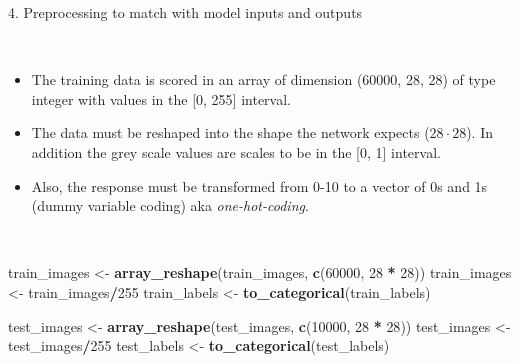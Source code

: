 \documentclass[10pt,ignorenonframetext,]{beamer}
\newenvironment{Shaded}{\begin{snugshade}}{\end{snugshade}}
\newcommand{\DecValTok}[1]{\textcolor[rgb]{0.00,0.00,0.81}{#1}}
\newcommand{\KeywordTok}[1]{\textcolor[rgb]{0.13,0.29,0.53}{\textbf{#1}}}
\newcommand{\NormalTok}[1]{#1}
\newcommand{\OperatorTok}[1]{\textcolor[rgb]{0.81,0.36,0.00}{\textbf{#1}}}
\newcommand{\StringTok}[1]{\textcolor[rgb]{0.31,0.60,0.02}{#1}}
\begin{document}
\begin{frame}[fragile]

\begin{block}{4. Preprocessing to match with model inputs and outputs}

\(~\)

\begin{itemize}
\item
  The training data is scored in an array of dimension (60000, 28, 28)
  of type integer with values in the {[}0, 255{]} interval.
\item
  The data must be reshaped into the shape the network expects
  (\(28\cdot 28\)). In addition the grey scale values are scales to be
  in the {[}0, 1{]} interval.
\item
  Also, the response must be transformed from 0-10 to a vector of 0s and
  1s (dummy variable coding) aka \emph{one-hot-coding}.
\end{itemize}

\(~\)

\scriptsize

\begin{Shaded}
\begin{Highlighting}[]
\NormalTok{train_images <-}\StringTok{ }\KeywordTok{array_reshape}\NormalTok{(train_images, }\KeywordTok{c}\NormalTok{(}\DecValTok{60000}\NormalTok{, }\DecValTok{28} \OperatorTok{*}\StringTok{ }\DecValTok{28}\NormalTok{))}
\NormalTok{train_images <-}\StringTok{ }\NormalTok{train_images}\OperatorTok{/}\DecValTok{255}
\NormalTok{train_labels <-}\StringTok{ }\KeywordTok{to_categorical}\NormalTok{(train_labels)}

\NormalTok{test_images <-}\StringTok{ }\KeywordTok{array_reshape}\NormalTok{(test_images, }\KeywordTok{c}\NormalTok{(}\DecValTok{10000}\NormalTok{, }\DecValTok{28} \OperatorTok{*}\StringTok{ }\DecValTok{28}\NormalTok{))}
\NormalTok{test_images <-}\StringTok{ }\NormalTok{test_images}\OperatorTok{/}\DecValTok{255}
\NormalTok{test_labels <-}\StringTok{ }\KeywordTok{to_categorical}\NormalTok{(test_labels)}
\end{Highlighting}
\end{Shaded}

\end{block}

\end{frame}
\end{document}
